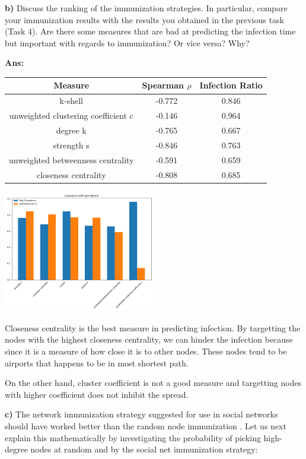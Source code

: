 \documentclass[a4paper,12pt]{article}
\begin{document}
\textbf{b)} Discuss the ranking of the immunization strategies. In particular, compare your
immunization results with the results you obtained in the previous task (Task 4). Are
there some measures that are bad at predicting the infection time but important with
regards to immunization? Or vice versa? Why?

\textbf{Ans: }
\begin{table}[h]
  \begin{tabular}{|c|c|c|}
    \hline
    Measure & Spearman  $\rho$ & Infection Ratio\\ \hline \hline
    k-shell & -0.772 & 0.846\\ \hline
    unweighted clustering coefficient c & -0.146 & 0.964\\ \hline
    degree k & -0.765 & 0.667\\ \hline
    strength s & -0.846 & 0.763\\ \hline
    unweighted betweenness centrality & -0.591 & 0.659\\ \hline
    closeness centrality & -0.808 & 0.685 \\ \hline
 \end{tabular}
\end{table}
\begin{center}
\includegraphics[width=0.5\textwidth]{compare}
\end{center}


Closeness centrality is the best measure in predicting infection. By targetting
the nodes with the highest closeness centrality, we can hinder the infection because since
it is a measure of how close it is to other nodes.  These nodes tend to be airports
that happens to be in most shortest path.

On the other hand, cluster coefficient is not a good measure and targetting nodes
with higher coefficient does not inhibit the spread.

\bigskip
\textbf{c)}  The network immunization strategy suggested for use in social networks should
have worked better than the random node immunization . Let us next explain this mathematically
by investigating the probability of picking high-degree nodes at random and by
the social net immunization strategy:
\end{document}

